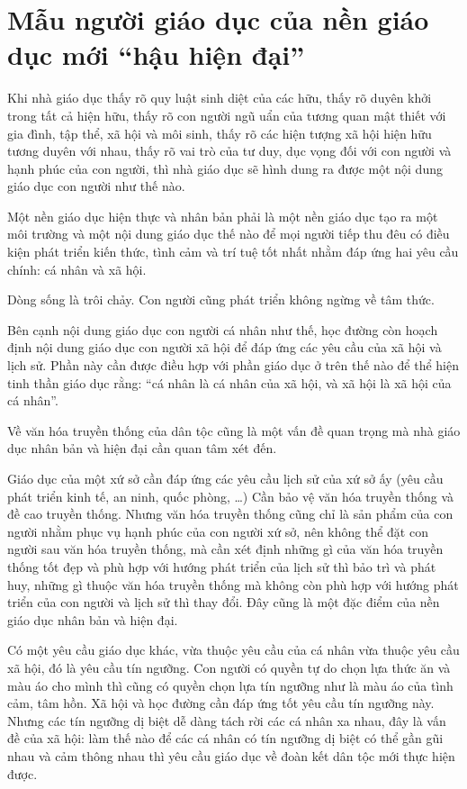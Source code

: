 \chapter{Mẫu người giáo dục của nền giáo dục mới ``hậu hiện đại''} %
\label{cha:mau_nguoi_giao_duc_cua_nen_giao_duc_moi}

Khi nhà giáo dục thấy rõ quy luật sinh diệt của các hữu, thấy rõ duyên khởi trong tất cả hiện hữu, thấy rõ con người ngũ uẩn của tương quan mật thiết với gia đình, tập thể, xã hội và môi sinh, thấy rõ các hiện tượng xã hội hiện hữu tương duyên với nhau, thấy rõ vai trò của tư duy, dục vọng đối với con người và hạnh phúc của con người, thì nhà giáo dục sẽ hình dung ra được một nội dung giáo dục con người như thế nào.

Một nền giáo dục hiện thực và nhân bản phải là một nền giáo dục tạo ra một môi trường và một nội dung giáo dục thế nào để mọi người tiếp thu đêu có điều kiện phát triển kiến thức, tình cảm và trí tuệ tốt nhất nhằm đáp ứng hai yêu cầu chính: cá nhân và xã hội.

Dòng sống là trôi chảy. Con người cũng phát triển không ngừng về tâm thức.

Bên cạnh nội dung giáo dục con người cá nhân như thế, học đường còn hoạch định nội dung giáo dục con người xã hội để đáp ứng các yêu cầu của xã hội và lịch sử. Phần này cần được điều hợp với phần giáo dục ở trên thế nào để thể hiện tinh thần giáo dục rằng: ``cá nhân là cá nhân của xã hội, và xã hội là xã hội của cá nhân''.

Về văn hóa truyền thống của dân tộc cũng là một vấn đề quan trọng mà nhà giáo dục nhân bản và hiện đại cần quan tâm xét đến.

Giáo dục của một xứ sở cần đáp ứng các yêu cầu lịch sử của xứ sở ấy (yêu cầu phát triển kinh tế, an ninh, quốc phòng, \ldots) Cần bảo vệ văn hóa truyền thống và đề cao truyền thống. Nhưng văn hóa truyền thống cũng chỉ là sản phẩm của con người nhằm phục vụ hạnh phúc của con người xứ sở, nên không thể đặt con người sau văn hóa truyền thống, mà cần xét định những gì của văn hóa truyền thống tốt đẹp và phù hợp với hướng phát triển của lịch sử thì bảo trì và phát huy, những gì thuộc văn hóa truyền thống mà không còn phù hợp với hướng phát triển của con người và lịch sử thì thay đổi. Đây cũng là một đặc điểm của nền giáo dục nhân bản và hiện đại.

Có một yêu cầu giáo dục khác, vừa thuộc yêu cầu của cá nhân vừa thuộc yêu cầu xã hội, đó là yêu cầu tín ngưỡng. Con người có quyền tự do chọn lựa thức ăn và màu áo cho mình thì cũng có quyền chọn lựa tín ngưỡng như là màu áo của tình cảm, tâm hồn. Xã hội và học đường cần đáp ứng tốt yêu cầu tín ngưỡng này. Nhưng các tín ngưỡng dị biệt dễ dàng tách rời các cá nhân xa nhau, đây là vấn đề của xã hội: làm thế nào để các cá nhân có tín ngưỡng dị biệt có thể gần gũi nhau và cảm thông nhau thì yêu cầu giáo dục về đoàn kết dân tộc mới thực hiện được.

